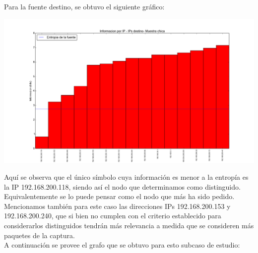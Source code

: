 \indent Para la fuente destino, se obtuvo el siguiente gráfico:

\begin{center}
\includegraphics[scale=0.5,clip=true,trim=100 0 0 0]{graphics/laburo_chica_dst.png}
\end{center}

\indent Aquí se observa que el único símbolo cuya información es menor a la entropía es la IP 192.168.200.118, siendo así el nodo que determinamos como distinguido. Equivalentemente se lo puede pensar como el nodo que más ha sido pedido.\\
\indent Mencionamos también para este caso las direcciones IPs 192.168.200.153 y 192.168.200.240, que si bien no cumplen con el criterio establecido para considerarlos distinguidos tendrán más relevancia a medida que se consideren más paquetes de la captura.\\

\indent A continuación se provee el grafo que se obtuvo para esto subcaso de estudio:\\

